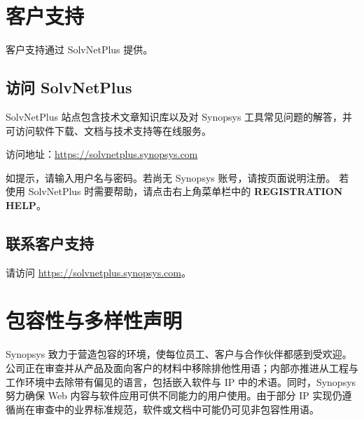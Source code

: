 \section*{客户支持}

客户支持通过 SolvNetPlus 提供。

\subsection*{访问 SolvNetPlus}

SolvNetPlus 站点包含技术文章知识库以及对 Synopsys 工具常见问题的解答，并可访问软件下载、文档与技术支持等在线服务。

访问地址：\url{https://solvnetplus.synopsys.com}

如提示，请输入用户名与密码。若尚无 Synopsys 账号，请按页面说明注册。
若使用 SolvNetPlus 时需要帮助，请点击右上角菜单栏中的 \textbf{REGISTRATION HELP}。

\subsection*{联系客户支持}

请访问 \url{https://solvnetplus.synopsys.com}。

\section*{包容性与多样性声明}

Synopsys 致力于营造包容的环境，使每位员工、客户与合作伙伴都感到受欢迎。公司正在审查并从产品及面向客户的材料中移除排他性用语；内部亦推进从工程与工作环境中去除带有偏见的语言，包括嵌入软件与 IP 中的术语。同时，Synopsys 努力确保 Web 内容与软件应用可供不同能力的用户使用。由于部分 IP 实现仍遵循尚在审查中的业界标准规范，软件或文档中可能仍可见非包容性用语。
